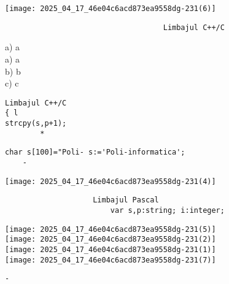 \begin{center}
\texttt{[image: 2025\_04\_17\_46e04c6acd873ea9558dg-231(6)]}
\end{center}

\begin{verbatim}
                                    Limbajul C++/C
\end{verbatim}

a) a\\
a) a\\
b) b\\
c) c

\begin{verbatim}
Limbajul C++/C
{ l
strcpy(s,p+1);
        *
\end{verbatim}

\begin{verbatim}
char s[100]="Poli- s:='Poli-informatica';
    -
\end{verbatim}

\begin{center}
\texttt{[image: 2025\_04\_17\_46e04c6acd873ea9558dg-231(4)]}
\end{center}

\begin{verbatim}
                    Limbajul Pascal
                        var s,p:string; i:integer;
\end{verbatim}

\texttt{[image: 2025\_04\_17\_46e04c6acd873ea9558dg-231(5)]}\\
\texttt{[image: 2025\_04\_17\_46e04c6acd873ea9558dg-231(2)]}\\
\texttt{[image: 2025\_04\_17\_46e04c6acd873ea9558dg-231(1)]}\\
\texttt{[image: 2025\_04\_17\_46e04c6acd873ea9558dg-231(7)]}

\begin{verbatim}
-
\end{verbatim}

